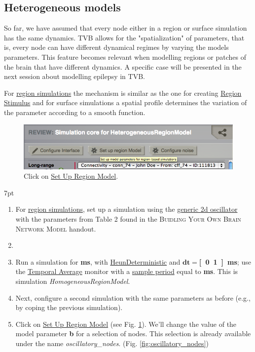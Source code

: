 \documentclass{tufte-handout}
\newenvironment{simulation}{%
  \def\FrameCommand{%
    \hspace{1pt}%
    {\color{ForestGreen}\vrule width 2pt}%
    {\color{simulationshade}\vrule width 4pt}%
    \colorbox{simulationshade}%
  }%
  \MakeFramed{\advance\hsize-\width\FrameRestore}%
  \noindent\hspace{-4.55pt}%
  \begin{adjustwidth}{}{7pt}%
  \vspace{2pt}\vspace{2pt}%
}
{%
  \vspace{2pt}\end{adjustwidth}\endMakeFramed%
}
\begin{document}
\subsection{Heterogeneous models}\label{sec:spatialization}

So far, we have assumed that every node either in a region or surface
simulation has the same dynamics. TVB allows for the "spatialization" of
parameters, that is, every node can have different dynamical regimes by
varying the models parameters. This feature becomes relevant when modelling
regions or patches of the brain that have different dynamics. A specific case
will be presented in the next session about modelling epilepsy in TVB.

For \underline{region simulations} the mechanism is similar as the one for creating \underline{Region
Stimulus} and for surface simulations a spatial profile determines the
variation of the parameter according to a smooth function.

\begin{figure}[h]
  \includegraphics[width=\linewidth]{Handout_UI_HeterogenousModelAndStimulation_SetUpRegionModel.png}%
  \caption{Click on \underline{Set Up Region Model}.}%
  \label{fig:setup_regionmodel}%
\end{figure}

\begin{simulation}
\begin{enumerate}
\item For \underline{region simulations}, set up a simulation using the \underline{generic 2d oscillator} with the parameters from Table 2  found in the \textsc{Buidling Your Own Brain Network Model} handout. 
\item \item Run a simulation for \textbf{\unit[1000]{ms}}, with \underline{HeunDeterministic} and $\mathbf{dt=}$\textbf{\unit[0.1]{ms}}; use the \underline{Temporal Average} monitor with a \underline{sample period} equal to \textbf{\unit[1]{ms}}.  This is simulation \textit{HomogeneousRegionModel}.
\item Next, configure a second simulation with the same parameters as before (e.g., by coping the previous simulation). 
\item Click on \underline{Set Up Region Model} (see Fig. \ref{fig:setup_regionmodel}). We'll change the value of the model parameter \textbf{b} for a selection of nodes. This selection is already available under the name \textit{oscillatory\_nodes}. (Fig. \ref{fig:oscillatory_nodes})
\end{enumerate}
\end{simulation}
\end{document}
